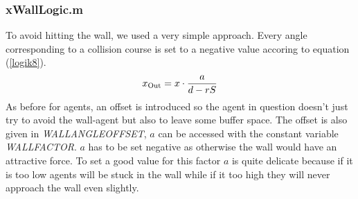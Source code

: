 \subsubsection{xWallLogic.m}
To avoid hitting the wall, we used a very simple approach. Every angle corresponding to a collision course is set to a negative value accoring to equation (\ref{logik8}).
\begin{equation}\label{logik8}
	x_{\text{Out}} = x \cdot \frac{a}{d - rS}
\end{equation}
\noi As before for agents, an offset is introduced so the agent in question doesn't just try to avoid the wall-agent but also to leave some buffer space. The offset is also given in \textit{WALLANGLEOFFSET}, $a$ can be accessed with the constant variable \textit{WALLFACTOR}. $a$ has to be set negative as otherwise the wall would have an attractive force. To set a good value for this factor $a$ is quite delicate because if it is too low agents will be stuck in the wall while if it too high they will never approach the wall even slightly. 



